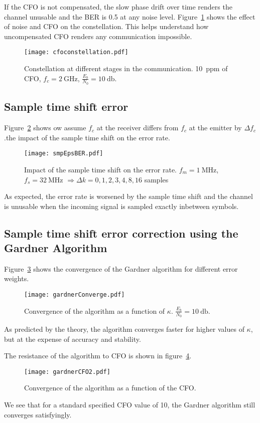 If the CFO is not compensated, the slow phase drift over time renders the channel unusable and the BER is 0.5 at any noise level. Figure~\ref{fig:cfoconst} shows the effect of noise and CFO on the constellation. This helps understand how uncompensated CFO renders any communication impossible.
\begin{figure}
  \centering
  \texttt{[image: cfoconstellation.pdf]}
  \caption{Constellation at different stages in the communication. \SI{10}{ppm} of CFO, $f_c = \SI{2}{\giga\hertz}$, $\frac{E_b}{N_0} = \SI{10}{\decibel}$.\label{fig:cfoconst}}
\end{figure}

\subsection{Sample time shift error}
Figure~\ref{fig:smpEpsBER} shows ow assume $f_c$ at the receiver differs from $f_c$ at the emitter by $\Delta f_c$.the impact of the sample time shift on the error rate.
\begin{figure}[htbp]
\centering
\texttt{[image: smpEpsBER.pdf]}
\caption{Impact of the sample time shift on the error rate. $f_m = \SI{1}{\mega\hertz}$, $f_s = \SI{32}{\mega\hertz}$ $\Rightarrow \Delta k = 0, 1, 2, 3, 4, 8, 16$ samples\label{fig:smpEpsBER}}
\end{figure}
As expected, the error rate is worsened by the sample time shift and the channel is unusable when the incoming signal is sampled exactly inbetween symbols.

\subsection{Sample time shift error correction using the Gardner Algorithm}
Figure~\ref{fig:gConvK} shows the convergence of the Gardner algorithm for different error weights.
\begin{figure}[htbp]
    \centering
    \texttt{[image: gardnerConverge.pdf]}
    \caption{Convergence of the algorithm as a function of $\kappa$. $\frac{E_b}{N_0} = \SI{10}{\decibel}$.\label{fig:gConvK}}
\end{figure}
As predicted by the theory, the algorithm converges faster for higher values of $\kappa$, but at the expense of accuracy and stability.

The resistance of the algorithm to CFO is shown in figure~\ref{fig:gConvCFO}.
\begin{figure}[htbp]
    \centering
    \texttt{[image: gardnerCFO2.pdf]}
    \caption{Convergence of the algorithm as a function of the CFO.\label{fig:gConvCFO}}
\end{figure}
We see that for a standard specified CFO value of \SI{10}{\ppm}, the Gardner algorithm still converges satisfyingly.

